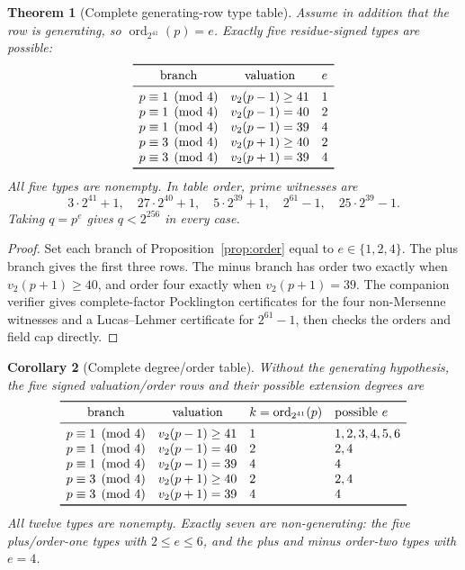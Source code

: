 \documentclass[11pt,a4paper]{amsart}
\newtheorem{theorem}{Theorem}[section]
\newtheorem{corollary}[theorem]{Corollary}
\theoremstyle{remark}
\newcommand{\ord}{\operatorname{ord}}
\begin{document}
\begin{theorem}[Complete generating-row type table]\label{thm:types}
Assume in addition that the row is generating, so
\(\ord_{2^{41}}(p)=e\).  Exactly five residue-signed types are possible:
\[
\begin{array}{ccl}
\toprule
\text{branch}&\text{valuation}&e\\
\midrule
p\equiv1\pmod4&v_2(p-1)\ge41&1\\
p\equiv1\pmod4&v_2(p-1)=40&2\\
p\equiv1\pmod4&v_2(p-1)=39&4\\
p\equiv3\pmod4&v_2(p+1)\ge40&2\\
p\equiv3\pmod4&v_2(p+1)=39&4\\
\bottomrule
\end{array}
\]
All five types are nonempty.  In table order, prime witnesses are
\[
 3\mathbin{\cdot}2^{41}+1,\quad
 27\mathbin{\cdot}2^{40}+1,\quad
 5\mathbin{\cdot}2^{39}+1,\quad
 2^{61}-1,\quad
 25\mathbin{\cdot}2^{39}-1.
\]
Taking \(q=p^e\) gives \(q<2^{256}\) in every case.
\end{theorem}

\begin{proof}
Set each branch of Proposition~\ref{prop:order} equal to
\(e\in\{1,2,4\}\).  The plus branch gives the first three rows.  The minus
branch has order two exactly when \(v_2(p+1)\ge40\), and order four exactly
when \(v_2(p+1)=39\).  The companion verifier gives complete-factor
Pocklington certificates for the four non-Mersenne witnesses and a
Lucas--Lehmer certificate for \(2^{61}-1\), then checks the orders and field
cap directly.
\end{proof}

\begin{corollary}[Complete degree/order table]\label{cor:alltypes}
Without the generating hypothesis, the five signed valuation/order rows and
their possible extension degrees are
\[
\begin{array}{ccll}
\toprule
\text{branch}&\text{valuation}&k=\ord_{2^{41}}(p)&\text{possible }e\\
\midrule
p\equiv1\pmod4&v_2(p-1)\ge41&1&1,2,3,4,5,6\\
p\equiv1\pmod4&v_2(p-1)=40&2&2,4\\
p\equiv1\pmod4&v_2(p-1)=39&4&4\\
p\equiv3\pmod4&v_2(p+1)\ge40&2&2,4\\
p\equiv3\pmod4&v_2(p+1)=39&4&4\\
\bottomrule
\end{array}
\]
All twelve types are nonempty.  Exactly seven are non-generating: the five
plus/order-one types with \(2\le e\le6\), and the plus and minus order-two
types with \(e=4\).
\end{corollary}
\end{document}
